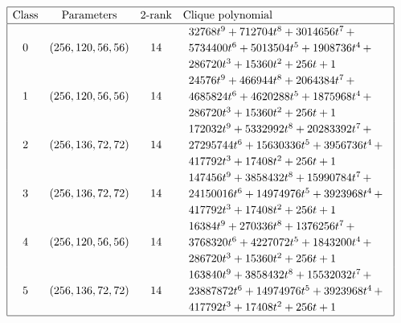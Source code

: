 \documentclass[12pt,a4paper]{article}
\begin{document}
\begin{table}[!bhpt] %
\small{}
\begin{align*}
\def\arraystretch{1.2}
\begin{array}{|cccl|}
\hline
\text{Class} &
\text{Parameters} &
\text{2-rank} &
\text{Clique polynomial}
\\
\hline
0 &
(256, 120, 56, 56) &
14 &
\begin{array}{l}
32768t^{9} + 712704t^{8} + 3014656t^{7}
\,+
\\
 5734400t^{6} + 5013504t^{5} + 1908736t^{4}
\,+
\\
 286720t^{3} + 15360t^{2} + 256t + 1
\end{array}
\\
1 &
(256, 120, 56, 56) &
14 &
\begin{array}{l}
24576t^{9} + 466944t^{8} + 2064384t^{7}
\,+
\\
 4685824t^{6} + 4620288t^{5} + 1875968t^{4}
\,+
\\
 286720t^{3} + 15360t^{2} + 256t + 1
\end{array}
\\
2 &
(256, 136, 72, 72) &
14 &
\begin{array}{l}
172032t^{9} + 5332992t^{8} + 20283392t^{7}
\,+
\\
 27295744t^{6} + 15630336t^{5} + 3956736t^{4}
\,+
\\
 417792t^{3} + 17408t^{2} + 256t + 1
\end{array}
\\
3 &
(256, 136, 72, 72) &
14 &
\begin{array}{l}
147456t^{9} + 3858432t^{8} + 15990784t^{7}
\,+
\\
 24150016t^{6} + 14974976t^{5} + 3923968t^{4}
\,+
\\
 417792t^{3} + 17408t^{2} + 256t + 1
\end{array}
\\
4 &
(256, 120, 56, 56) &
14 &
\begin{array}{l}
16384t^{9} + 270336t^{8} + 1376256t^{7}
\,+
\\
 3768320t^{6} + 4227072t^{5} + 1843200t^{4}
\,+
\\
 286720t^{3} + 15360t^{2} + 256t + 1
\end{array}
\\
5 &
(256, 136, 72, 72) &
14 &
\begin{array}{l}
163840t^{9} + 3858432t^{8} + 15532032t^{7}
\,+
\\
 23887872t^{6} + 14974976t^{5} + 3923968t^{4}
\,+
\\
 417792t^{3} + 17408t^{2} + 256t + 1
\end{array}
\\
\hline
\end{array}
\end{align*}
\caption{$[f_{8,8}]$ extended Cayley classes.}
\label{tab-c8_8_EC_classes}
\end{table}
\end{document}
